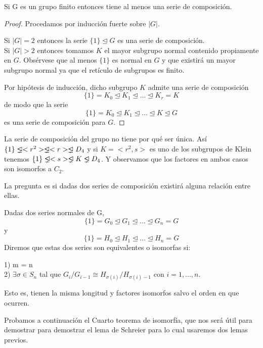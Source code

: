 \begin{nth}
Si G es un grupo finito entonces tiene al menos una serie de composición.
\end{nth}
\begin{proof}
Procedamos por inducción fuerte sobre $|G|$. 

Si $|G| = 2$ entonces la serie $\{1\} \trianglelefteq G$ es una serie de composición.\\
Si $|G| > 2$ entonces tomamos $K$ el mayor subgrupo normal contenido propiamente en $G$. Obsérvese que al menos $\{1\}$ es normal en $G$ y que existirá un mayor subgrupo normal ya que el retículo de subgrupos es finito. 

Por hipótesis de inducción, dicho subgrupo $K$ admite una serie de composición $$\{1\} = K_0 \trianglelefteq K_1 \trianglelefteq ... \trianglelefteq K_r = K$$ de modo que la serie $$\{1\} = K_0 \trianglelefteq K_1 \trianglelefteq ... \trianglelefteq K \trianglelefteq G$$ es una serie de composición para $G$.
\end{proof}

\begin{ejemplo}
La serie de composición del grupo no tiene por qué ser única. Así $\{1\} \propernormal <r^2> \propernormal <r> \propernormal D_4$ y si $K = <r^2,s>$ es uno de los subgrupos de Klein tenemos $\{1\} \propernormal <s> \propernormal K \propernormal D_4$. Y observamos que los factores en ambos casos son isomorfos a $C_2$.
\end{ejemplo}

La pregunta es si dadas dos series de composición existirá alguna relación entre ellas.

\begin{ndef}
Dadas dos series normales de G, $$\{1\} = G_0 \trianglelefteq G_1 \trianglelefteq ... \trianglelefteq G_n = G$$ y $$\{1\} = H_0 \trianglelefteq H_1 \trianglelefteq ... \trianglelefteq H_n = G$$ Diremos que estas dos series son equivalentes o isomorfas si:

1) m = n\\
2) $\exists \sigma \in S_n$ tal que $G_i/G_{i-1} \cong H_{\sigma(i)}/H_{\sigma(i)-1}$ con $i=1,...,n$. 

Esto es, tienen la misma longitud y factores isomorfos salvo el orden en que ocurren.
\end{ndef}

Probamos a continuación el Cuarto teorema de isomorfía, que nos será útil para demostrar para demostrar el lema de Schreier para lo cual usaremos dos lemas previos.


